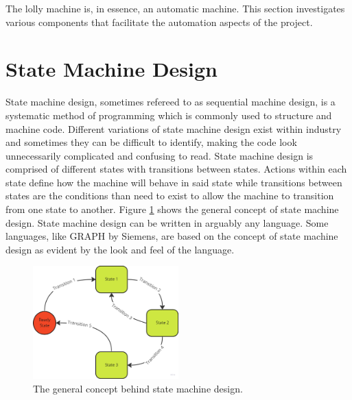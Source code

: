 
The lolly machine is, in essence, an automatic machine. This section investigates various components that facilitate the automation aspects of the project.

\section{State Machine Design}
    State machine design, sometimes refereed to as sequential machine design, is a systematic method of programming which is commonly used to structure and machine code. Different variations of state machine design exist within industry and sometimes they can be difficult to identify, making the code look unnecessarily complicated and confusing to read. State machine design is comprised of different states with transitions between states. Actions within each state define how the machine will behave in said state while transitions between states are the conditions than need to exist to allow the machine to transition from one state to another. Figure \ref{fig:stateMachineEx} shows the general concept of state machine design. State machine design can be written in arguably any language. Some languages, like GRAPH by Siemens, are based on the concept of state machine design as evident by the look and feel of the language. 


        \begin{figure}[H]
        \centering
        \includegraphics[width = 0.5\textwidth]{2_images/stateMachineEx}
        \caption{The general concept behind state machine design.}
        \label{fig:stateMachineEx}
    \end{figure}

